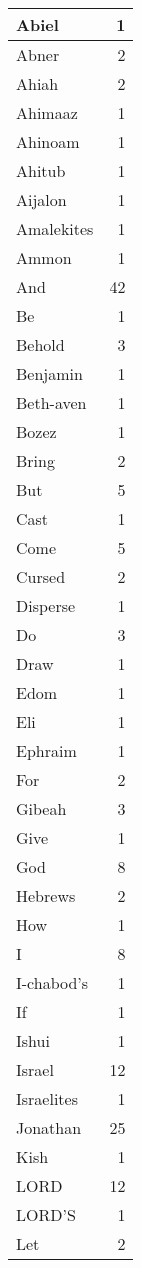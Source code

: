 \begin{center}
\begin{longtable}{l|r}
\hline \hline
\endlastfoot
Abiel & 1 \\ \hline
Abner & 2 \\ \hline
Ahiah & 2 \\ \hline
Ahimaaz & 1 \\ \hline
Ahinoam & 1 \\ \hline
Ahitub & 1 \\ \hline
Aijalon & 1 \\ \hline
Amalekites & 1 \\ \hline
Ammon & 1 \\ \hline
And & 42 \\ \hline
Be & 1 \\ \hline
Behold & 3 \\ \hline
Benjamin & 1 \\ \hline
Beth-aven & 1 \\ \hline
Bozez & 1 \\ \hline
Bring & 2 \\ \hline
But & 5 \\ \hline
Cast & 1 \\ \hline
Come & 5 \\ \hline
Cursed & 2 \\ \hline
Disperse & 1 \\ \hline
Do & 3 \\ \hline
Draw & 1 \\ \hline
Edom & 1 \\ \hline
Eli & 1 \\ \hline
Ephraim & 1 \\ \hline
For & 2 \\ \hline
Gibeah & 3 \\ \hline
Give & 1 \\ \hline
God & 8 \\ \hline
Hebrews & 2 \\ \hline
How & 1 \\ \hline
I & 8 \\ \hline
I-chabod's & 1 \\ \hline
If & 1 \\ \hline
Ishui & 1 \\ \hline
Israel & 12 \\ \hline
Israelites & 1 \\ \hline
Jonathan & 25 \\ \hline
Kish & 1 \\ \hline
LORD & 12 \\ \hline
LORD'S & 1 \\ \hline
Let & 2 \\ \hline

\end{longtable}
\end{center}
